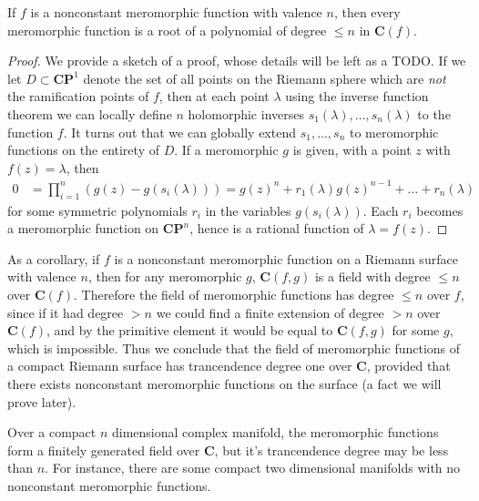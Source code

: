 \begin{theorem}
    If $f$ is a nonconstant meromorphic function with valence $n$, then every meromorphic function is a root of a polynomial of degree $\leq n$ in $\mathbf{C}(f)$.
\end{theorem}
\begin{proof}
    We provide a sketch of a proof, whose details will be left as a TODO. If we let $D \subset \mathbf{CP}^1$ denote the set of all points on the Riemann sphere which are {\it not} the ramification points of $f$, then at each point $\lambda$ using the inverse function theorem we can locally define $n$ holomorphic inverses $s_1(\lambda), \dots, s_n(\lambda)$ to the function $f$. It turns out that we can globally extend $s_1, \dots, s_n$ to meromorphic functions on the entirety of $D$. If a meromorphic $g$ is given, with a point $z$ with $f(z) = \lambda$, then
    \begin{align*}
        0 &= \prod_{i = 1}^n (g(z) - g(s_i(\lambda))) = g(z)^n + r_1(\lambda) g(z)^{n-1} + \dots + r_n(\lambda)
    \end{align*}
    for some symmetric polynomials $r_i$ in the variables $g(s_i(\lambda))$. Each $r_i$ becomes a meromorphic function on $\mathbf{CP}^n$, hence is a rational function of $\lambda = f(z)$.
\end{proof}

As a corollary, if $f$ is a nonconstant meromorphic function on a Riemann surface with valence $n$, then for any meromorphic $g$, $\mathbf{C}(f,g)$ is a field with degree $\leq n$ over $\mathbf{C}(f)$. Therefore the field of meromorphic functions has degree $\leq n$ over $f$, since if it had degree $> n$ we could find a finite extension of degree $> n$ over $\mathbf{C}(f)$, and by the primitive element it would be equal to $\mathbf{C}(f,g)$ for some $g$, which is impossible. Thus we conclude that the field of meromorphic functions of a compact Riemann surface has trancendence degree one over $\mathbf{C}$, provided that there exists nonconstant meromorphic functions on the surface (a fact we will prove later).

\begin{remark}
    Over a compact $n$ dimensional complex manifold, the meromorphic functions form a finitely generated field over $\mathbf{C}$, but it's trancendence degree may be less than $n$. For instance, there are some compact two dimensional manifolds with no nonconstant meromorphic functions.
\end{remark}

